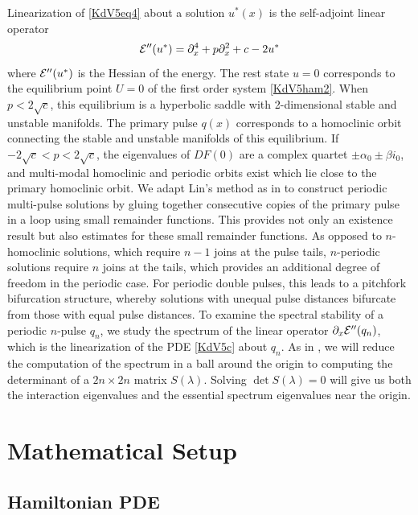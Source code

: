 \documentclass[10pt,reqno]{amsart}
\theoremstyle{plain}
\theoremstyle{definition}
\theoremstyle{remark}
\numberwithin{theorem}{section}
\numberwithin{equation}{section}
\begin{document}
Linearization of \cref{KdV5eq4} about a solution $u^*(x)$ is the self-adjoint linear operator
\begin{equation}\label{KdV5hessian}
\mathcal{E}''(u^*) = \partial_x^4 + p \partial_x^2 + c - 2 u^* 
\end{equation}
where $\mathcal{E}''(u^*)$ is the Hessian of the energy. The rest state $u = 0$ corresponds to the equilibrium point $U = 0$ of the first order system \cref{KdV5ham2}. When $p < 2 \sqrt{c}$, this equilibrium is a hyperbolic saddle with 2-dimensional stable and unstable manifolds. The primary pulse $q(x)$ corresponds to a homoclinic orbit connecting the stable and unstable manifolds of this equilibrium. If $-2 \sqrt{c} < p < 2 \sqrt{c}$, the eigenvalues of $DF(0)$ are a complex quartet $\pm \alpha_0 \pm \beta i_0$, and multi-modal homoclinic and periodic orbits exist which lie close to the primary homoclinic orbit. We adapt Lin's method as in \cite{Sandstede1993, SandstedeStrut} to construct periodic multi-pulse solutions by gluing together consecutive copies of the primary pulse in a loop using small remainder functions. This provides not only an existence result but also estimates for these small remainder functions. As opposed to $n$-homoclinic solutions, which require $n-1$ joins at the pulse tails, $n$-periodic solutions require $n$ joins at the tails, which provides an additional degree of freedom in the periodic case. For periodic double pulses, this leads to a pitchfork bifurcation structure, whereby solutions with unequal pulse distances bifurcate from those with equal pulse distances. To examine the spectral stability of a periodic $n$-pulse $q_n$, we study the spectrum of the linear operator $\partial_x \mathcal{E}''(q_n)$, which is the linearization of the PDE \eqref{KdV5c} about $q_n$. As in \cite{Sandstede1998}, we will reduce the computation of the spectrum in a ball around the origin to computing the determinant of a $2n \times 2n$ matrix $S(\lambda)$. Solving $\det S(\lambda) = 0$ will give us both the interaction eigenvalues and the essential spectrum eigenvalues near the origin.

\section{Mathematical Setup}\label{sec:setup}

\subsection{Hamiltonian PDE}\label{sec:HamPDE}
\end{document}
